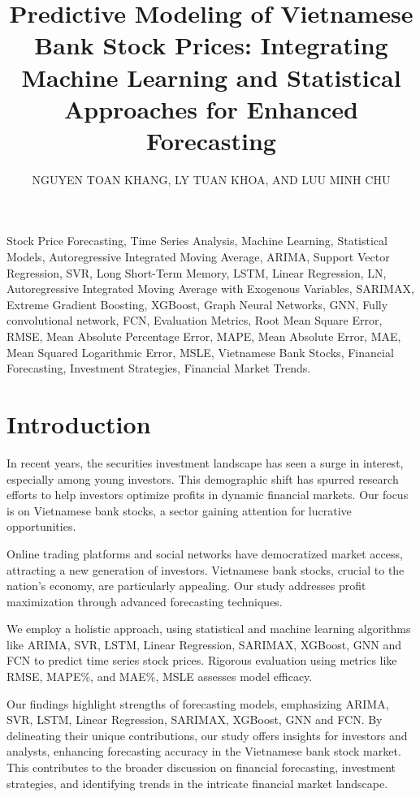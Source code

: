 \documentclass{ieeeojies}
\title{ Predictive Modeling of Vietnamese Bank Stock Prices: Integrating Machine Learning and Statistical Approaches for Enhanced Forecasting}
\author{\uppercase{Nguyen Toan Khang}\authorrefmark{1},
\uppercase{Ly Tuan Khoa\authorrefmark{2}, and Luu Minh Chu}\authorrefmark{3}}
\begin{document}
\begin{keywords}
Stock Price Forecasting, Time Series Analysis, Machine Learning, Statistical Models, Autoregressive Integrated Moving Average, ARIMA, Support Vector Regression, SVR, Long Short-Term Memory, LSTM, Linear Regression, LN, Autoregressive Integrated Moving Average with Exogenous Variables, SARIMAX, Extreme Gradient Boosting, XGBoost, Graph Neural Networks, GNN, Fully convolutional network, FCN, Evaluation Metrics, Root Mean Square Error, RMSE, Mean Absolute Percentage Error, MAPE, Mean Absolute Error, MAE, Mean Squared Logarithmic Error, MSLE, Vietnamese Bank Stocks, Financial Forecasting, Investment Strategies, Financial Market Trends.
\end{keywords}

\titlepgskip=-15pt

\maketitle

\section{\centering Introduction}
\label{sec:introduction}
\hspace{0.3cm} In recent years, the securities investment landscape has seen a surge in interest, especially among young investors. This demographic shift has spurred research efforts to help investors optimize profits in dynamic financial markets. Our focus is on Vietnamese bank stocks, a sector gaining attention for lucrative opportunities.

Online trading platforms and social networks have democratized market access, attracting a new generation of investors. Vietnamese bank stocks, crucial to the nation's economy, are particularly appealing. Our study addresses profit maximization through advanced forecasting techniques.

We employ a holistic approach, using statistical and machine learning algorithms like ARIMA, SVR, LSTM, Linear Regression, SARIMAX, XGBoost, GNN and FCN to predict time series stock prices. Rigorous evaluation using metrics like RMSE, MAPE\%, and MAE\%, MSLE assesses model efficacy.

Our findings highlight strengths of forecasting models, emphasizing ARIMA, SVR, LSTM, Linear Regression, SARIMAX, XGBoost, GNN and FCN. By delineating their unique contributions, our study offers insights for investors and analysts, enhancing forecasting accuracy in the Vietnamese bank stock market. This contributes to the broader discussion on financial forecasting, investment strategies, and identifying trends in the intricate financial market landscape.
\end{document}
